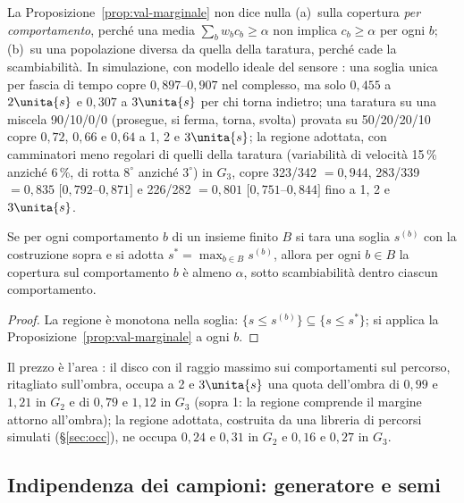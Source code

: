 \begin{osservazione}\label{oss:val-nonvale}
La Proposizione~\ref{prop:val-marginale} non dice nulla (a)~sulla copertura \emph{per comportamento}, perché una media $\sum_bw_bc_b\ge\alpha$ non implica $c_b\ge\alpha$ per ogni $b$; (b)~su una popolazione diversa da quella della taratura, perché cade la scambiabilità. In simulazione, con modello ideale del sensore : una soglia unica per fascia di tempo copre $0{,}897$–$0{,}907$ nel complesso, ma solo $0{,}455$ a $2\unita{s}$ e $0{,}307$ a $3\unita{s}$ per chi torna indietro; una taratura su una miscela 90/10/0/0 (prosegue, si ferma, torna, svolta) provata su 50/20/20/10 copre $0{,}72$, $0{,}66$ e $0{,}64$ a 1, 2 e $3\unita{s}$; la regione adottata, con camminatori meno regolari di quelli della taratura (variabilità di velocità 15\,\% anziché 6\,\%, di rotta $8^\circ$ anziché $3^\circ$) in $G_3$, copre 323/342 $=0{,}944$, 283/339 $=0{,}835$ $[0{,}792$–$0{,}871]$ e 226/282 $=0{,}801$ $[0{,}751$–$0{,}844]$ fino a 1, 2 e $3\unita{s}$.
\end{osservazione}

\begin{proposizione}\label{prop:val-suolo}
Se per ogni comportamento $b$ di un insieme finito $B$ si tara una soglia $s^{(b)}$ con la costruzione sopra e si adotta $s^\ast=\max_{b\in B}s^{(b)}$, allora per ogni $b\in B$ la copertura sul comportamento $b$ è almeno $\alpha$, sotto scambiabilità dentro ciascun comportamento. 
\end{proposizione}
\begin{proof}
La regione è monotona nella soglia: $\{s\le s^{(b)}\}\subseteq\{s\le s^\ast\}$; si applica la Proposizione~\ref{prop:val-marginale} a ogni $b$.
\end{proof}
Il prezzo è l'area : il disco con il raggio massimo sui comportamenti sul percorso, ritagliato sull'ombra, occupa a 2 e $3\unita{s}$ una quota dell'ombra di $0{,}99$ e $1{,}21$ in $G_2$ e di $0{,}79$ e $1{,}12$ in $G_3$ (sopra 1: la regione comprende il margine attorno all'ombra); la regione adottata, costruita da una libreria di percorsi simulati (\S\ref{sec:occ}), ne occupa $0{,}24$ e $0{,}31$ in $G_2$ e $0{,}16$ e $0{,}27$ in $G_3$.

\subsection{Indipendenza dei campioni: generatore e semi}\label{sec:val-semi}

